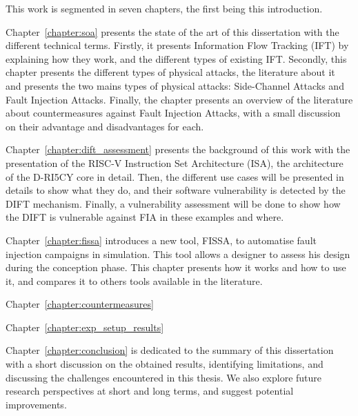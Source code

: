This work is segmented in seven chapters, the first being this introduction.

Chapter~\ref{chapter:soa} presents the state of the art of this dissertation with the different technical terms. Firstly, it presents Information Flow Tracking (IFT) by explaining how they work, and the different types of existing IFT.
Secondly, this chapter presents the different types of physical attacks, the literature about it and presents the two mains types of physical attacks: Side-Channel Attacks and Fault Injection Attacks.
Finally, the chapter presents an overview of the literature about countermeasures against Fault Injection Attacks, with a small discussion on their advantage and disadvantages for each.

Chapter~\ref{chapter:dift_assessment} presents the background of this work with the presentation of the RISC-V Instruction Set Architecture (ISA), the architecture of the D-RI5CY core in detail. Then, the different use cases will be presented in details to show what they do, and their software vulnerability is detected by the DIFT mechanism. Finally, a vulnerability assessment will be done to show how the DIFT is vulnerable against FIA in these examples and where.

Chapter~\ref{chapter:fissa} introduces a new tool, FISSA, to automatise fault injection campaigns in simulation. This tool allows a designer to assess his design during the conception phase. This chapter presents how it works and how to use it, and compares it to others tools available in the literature.

Chapter~\ref{chapter:countermeasures}  %

Chapter~\ref{chapter:exp_setup_results} 

Chapter~\ref{chapter:conclusion} is dedicated to the summary of this dissertation with a short discussion on the obtained results, identifying limitations, and discussing the challenges encountered in this thesis.
We also explore future research perspectives at short and long terms, and suggest potential improvements.



